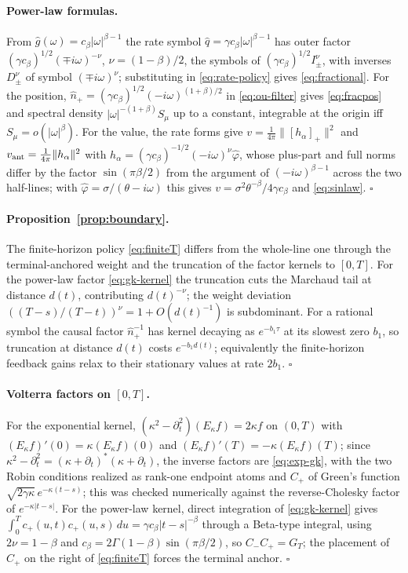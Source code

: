 \documentclass[11pt]{article}
\newcommand{\pluspart}[1]{\left[#1\right]_+}
\theoremstyle{plain}
\theoremstyle{definition}
\theoremstyle{remark}
\begin{document}
\paragraph{Power-law formulas.} From $\hat g(\omega)=c_\beta|\omega|^{\beta-1}$ the rate symbol $\hat q=\gamma c_\beta|\omega|^{\beta-1}$ has outer factor $(\gamma c_\beta)^{1/2}(\mp i\omega)^{-\nu}$, $\nu=(1-\beta)/2$, the symbols of $(\gamma c_\beta)^{1/2}I^\nu_\pm$, with inverses $D^\nu_\pm$ of symbol $(\mp i\omega)^\nu$; substituting in \eqref{eq:rate-policy} gives \eqref{eq:fractional}. For the position, $\hat n_+=(\gamma c_\beta)^{1/2}(-i\omega)^{(1+\beta)/2}$ in \eqref{eq:ou-filter} gives \eqref{eq:fracpos} and spectral density $|\omega|^{-(1+\beta)}S_\mu$ up to a constant, integrable at the origin iff $S_\mu=o(|\omega|^\beta)$. For the value, the rate forms give $v=\tfrac1{4\pi}\|\pluspart{h_\alpha}\|^2$ and $v_{\rm ant}=\tfrac1{4\pi}\|h_\alpha\|^2$ with $h_\alpha=(\gamma c_\beta)^{-1/2}(-i\omega)^\nu\hat\varphi$, whose plus-part and full norms differ by the factor $\sin(\pi\beta/2)$ from the argument of $(-i\omega)^{\beta-1}$ across the two half-lines; with $\hat\varphi=\sigma/(\theta-i\omega)$ this gives $v=\sigma^2\theta^{-\beta}/4\gamma c_\beta$ and \eqref{eq:sinlaw}. $\square$

\paragraph{Proposition~\ref{prop:boundary}.} The finite-horizon policy \eqref{eq:finiteT} differs from the whole-line one through the terminal-anchored weight and the truncation of the factor kernels to $[0,T]$. For the power-law factor \eqref{eq:gk-kernel} the truncation cuts the Marchaud tail at distance $d(t)$, contributing $d(t)^{-\nu}$; the weight deviation $((T-s)/(T-t))^\nu=1+O(d(t)^{-1})$ is subdominant. For a rational symbol the causal factor $\hat n_+^{-1}$ has kernel decaying as $e^{-b_1\tau}$ at its slowest zero $b_1$, so truncation at distance $d(t)$ costs $e^{-b_1 d(t)}$; equivalently the finite-horizon feedback gains relax to their stationary values at rate $2b_1$. $\square$

\paragraph{Volterra factors on $[0,T]$.} For the exponential kernel, $(\kappa^2-\partial_t^2)(E_\kappa f)=2\kappa f$ on $(0,T)$ with $(E_\kappa f)'(0)=\kappa(E_\kappa f)(0)$ and $(E_\kappa f)'(T)=-\kappa(E_\kappa f)(T)$; since $\kappa^2-\partial_t^2=(\kappa+\partial_t)^\ast(\kappa+\partial_t)$, the inverse factors are \eqref{eq:exp-gk}, with the two Robin conditions realized as rank-one endpoint atoms and $C_+$ of Green's function $\sqrt{2\gamma\kappa}\,e^{-\kappa(t-s)}$; this was checked numerically against the reverse-Cholesky factor of $e^{-\kappa|t-s|}$. For the power-law kernel, direct integration of \eqref{eq:gk-kernel} gives $\int_0^T c_+(u,t)c_+(u,s)\,du=\gamma c_\beta|t-s|^{-\beta}$ through a Beta-type integral, using $2\nu=1-\beta$ and $c_\beta=2\Gamma(1-\beta)\sin(\pi\beta/2)$, so $C_-C_+=G_T$; the placement of $C_+$ on the right of \eqref{eq:finiteT} forces the terminal anchor. $\square$
\end{document}

